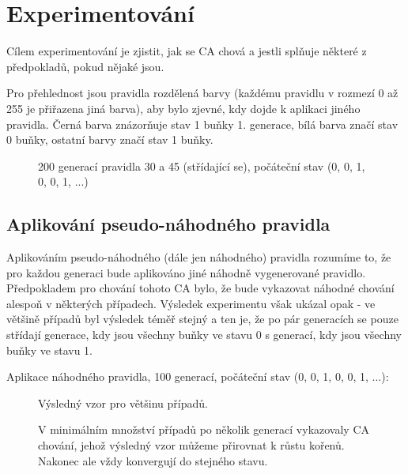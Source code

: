 \section{Experimentování}
Cílem experimentování je zjistit, jak se CA chová a jestli splňuje některé
z předpokladů, pokud nějaké jsou.

Pro přehlednost jsou pravidla rozdělená barvy (každému pravidlu
v rozmezí 0 až 255 je přiřazena jiná barva), aby bylo zjevné, kdy dojde
k aplikaci jiného pravidla.
Černá barva znázorňuje stav 1 buňky 1. generace, bílá barva značí stav 0 buňky,
ostatní barvy značí stav 1 buňky.

\begin{figure}[h]
	\centering
	\caption{200 generací pravidla 30 a 45 (střídající se), počáteční stav (0, 0, 1, 0, 0, 1, ...)}
\end{figure}

\newpage
\subsection{Aplikování pseudo-náhodného pravidla}
Aplikováním pseudo-náhodného (dále jen náhodného) pravidla rozumíme to,
že pro každou generaci bude aplikováno jiné náhodně vygenerované pravidlo.
Předpokladem pro chování tohoto CA bylo, že bude vykazovat náhodné
chování alespoň v některých případech.
Výsledek experimentu však ukázal opak - ve většině případů byl výsledek téměř stejný
a ten je, že po pár generacích se pouze střídají generace, kdy jsou všechny buňky
ve stavu 0 s generací, kdy jsou všechny buňky ve stavu 1.

Aplikace náhodného pravidla, 100 generací, počáteční stav (0, 0, 1, 0, 0, 1, ...):
\begin{figure}[h]
	\centering
	\hspace{3em}
	\caption{Výsledný vzor pro většinu případů.}
\end{figure}

\begin{figure}[h]
	\centering
	\hspace{3em}
	\caption{V minimálním množství případů po několik generací
	vykazovaly CA chování, jehož výsledný vzor můžeme přirovnat k růstu kořenů.
	Nakonec ale vždy konvergují do stejného stavu.}
\end{figure}

